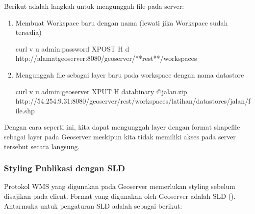 \documentclass[letterpaper,10pt,english]{sphinxmanual}
\begin{document}
Berikut adalah langkah untuk mengunggah file pada server:
\begin{enumerate}
%
\item {} 
Membuat Workspace baru dengan nama  (lewati jika Workspace sudah tersedia)

\begin{sphinxVerbatim}[commandchars=\\\{\}]
curl \PYGZhy{}v \PYGZhy{}u admin:password \PYGZhy{}XPOST \PYGZhy{}H   \PYGZhy{}d  http://alamatgeoserver:8080/geoserver/**rest**/workspaces
\end{sphinxVerbatim}

\item {} 
Mengunggah file  sebagai layer baru pada workspace  dengan nama datastore 

\begin{sphinxVerbatim}[commandchars=\\\{\}]
curl \PYGZhy{}v \PYGZhy{}u admin:geoserver \PYGZhy{}XPUT \PYGZhy{}H  \PYGZhy{}\PYGZhy{}data\PYGZhy{}binary @jalan.zip http://54.254.9.31:8080/geoserver/rest/workspaces/latihan/datastores/jalan/file.shp
\end{sphinxVerbatim}

\end{enumerate}

Dengan cara seperti ini, kita dapat mengunggah layer dengan format shapefile sebagai layer pada Geoserver meskipun kita tidak memiliki akses pada server tersebut secara langsung.


\subsubsection{Styling Publikasi dengan SLD}
\label{\detokenize{sesi3/publikasi:styling-publikasi-dengan-sld}}
Protokol WMS yang digunakan pada Geoserver memerlukan styling sebelum disajikan pada client. Format yang digunakan oleh Geoserver adalah SLD (). Antarmuka untuk pengaturan SLD adalah sebagai berikut:

\end{document}
